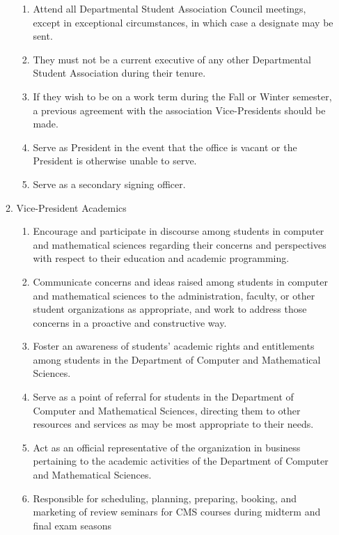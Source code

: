 \documentclass[12pt,a4paper]{article}
\begin{document}
\begin{enumerate}
\begin{enumerate}
\begin{enumerate}
\item Attend all Departmental Student Association Council meetings, except in exceptional circumstances, in which case a designate may be sent.

\item They must not be a current executive of any other Departmental Student Association during their tenure.

\item If they wish to be on a work term during the Fall or Winter semester, a previous agreement with the association Vice-Presidents should be made.

\item Serve as President in the event that the office is vacant or the President is otherwise unable to serve.

\item Serve as a secondary signing officer.
\end{enumerate}

\item Vice-President Academics

\begin{enumerate}
\item Encourage and participate in discourse among students in computer and mathematical sciences regarding their concerns and perspectives with respect to their education and academic programming.

\item Communicate concerns and ideas raised among students in computer and mathematical sciences to the administration, faculty, or other student organizations as appropriate, and work to address those concerns in a proactive and constructive way.

\item Foster an awareness of students' academic rights and entitlements among students in the Department of Computer and Mathematical Sciences.

\item Serve as a point of referral for students in the Department of Computer and Mathematical Sciences, directing them to other resources and services as may be most appropriate to their needs.

\item Act as an official representative of the organization in business pertaining to the academic activities of the Department of Computer and Mathematical Sciences.

\item Responsible for scheduling, planning, preparing, booking, and marketing of review seminars for CMS courses during midterm and final exam seasons


\end{enumerate}
\end{enumerate}
\end{enumerate}
\end{document}
